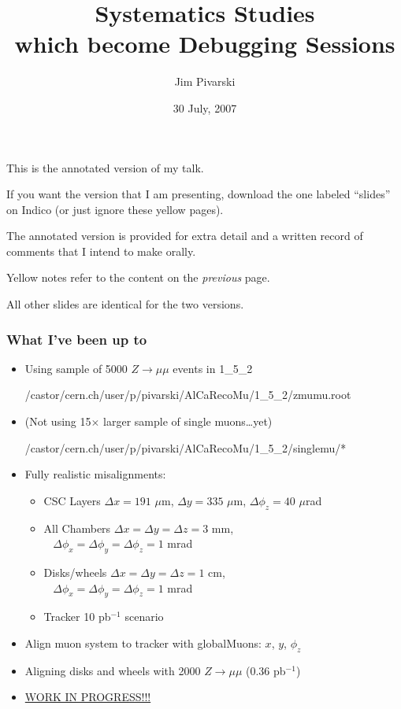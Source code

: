 \documentclass[compress]{beamer}
\title{Systematics Studies \\ which become Debugging Sessions}
\author{Jim Pivarski}
\institute{Texas A\&M University}
\date{30 July, 2007}
\begin{document}
\frame{\titlepage}

\begin{notes}
\item This is the annotated version of my talk.
\item If you want the version that I am presenting, download the one
labeled ``slides'' on Indico (or just ignore these yellow pages).
\item The annotated version is provided for extra detail and a written
record of comments that I intend to make orally.
\item Yellow notes refer to the content on the {\it previous} page.
\item All other slides are identical for the two versions.
\end{notes}

\begin{frame}
\frametitle{What I've been up to}
\begin{itemize}\setlength{\itemsep}{0.1 cm}
\item Using sample of 5000 $Z\to\mu\mu$ events in 1\_5\_2
\begin{center}
\tiny /castor/cern.ch/user/p/pivarski/AlCaRecoMu/1\_5\_2/zmumu.root
\end{center}

\item (Not using 15$\times$ larger sample of single muons\ldots yet)
\begin{center}
\tiny /castor/cern.ch/user/p/pivarski/AlCaRecoMu/1\_5\_2/singlemu/*
\end{center}

\item Fully realistic misalignments:
\begin{itemize}\setlength{\itemsep}{0.05 cm}
  \item CSC Layers $\Delta x = 191$ $\mu$m, $\Delta y = 335$ $\mu$m, $\Delta \phi_z = 40$ $\mu$rad
  \item All Chambers $\Delta x = \Delta y = \Delta z = 3$ mm, \\ \mbox{ } \hfill $\Delta \phi_x = \Delta \phi_y = \Delta \phi_z = 1$ mrad
  \item Disks/wheels $\Delta x = \Delta y = \Delta z = 1$ cm, \\ \mbox{ } \hfill $\Delta \phi_x = \Delta \phi_y = \Delta \phi_z = 1$ mrad
  \item Tracker 10 pb$^{-1}$ scenario
\end{itemize}

\item Align muon system to tracker with globalMuons: $x$, $y$, $\phi_z$

\item Aligning disks and wheels with 2000 $Z \to \mu\mu$ (0.36 pb$^{-1}$)

\item \underline{WORK IN PROGRESS!!!}

\end{itemize}
\end{frame}
\end{document}
